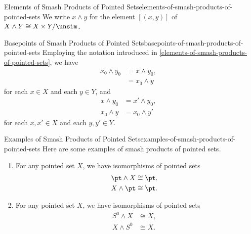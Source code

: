\begin{notation}{Elements of Smash Products of Pointed Sets}{elements-of-smash-products-of-pointed-sets}%
    We write $x\wedge y$ for the element $[(x,y)]$ of $X\wedge Y\cong X\times Y/\unsim$.%
\end{notation}
\begin{remark}{Basepoints of Smash Products of Pointed Sets}{basepoints-of-smash-products-of-pointed-sets}%
    Employing the notation introduced in \cref{elements-of-smash-products-of-pointed-sets}, we have
    \begin{align*}
        x_{0}\wedge y_{0} &= x\wedge y_{0},\\%
                          &= x_{0}\wedge y%
    \end{align*}
    for each $x\in X$ and each $y\in Y$, and
    \begin{align*}
        x\wedge y_{0} &= x'\wedge y_{0},\\%
        x_{0}\wedge y &= x_{0}\wedge y'%
    \end{align*}
    for each $x,x'\in X$ and each $y,y'\in Y$.
\end{remark}
\begin{example}{Examples of Smash Products of Pointed Sets}{examples-of-smash-products-of-pointed-sets}%
    Here are some examples of smash products of pointed sets.
    \begin{enumerate}
        \item\label{examples-of-smash-products-of-pointed-sets-smashing-with-pt}For any pointed set $X$, we have isomorphisms of pointed sets
            \begin{align*}
                \pt\wedge X &\cong \pt,\\
                X\wedge\pt  &\cong \pt.
            \end{align*}
        \item\label{examples-of-smash-products-of-pointed-sets-smashing-with-s-zero}For any pointed set $X$, we have isomorphisms of pointed sets
            \begin{align*}
                S^{0}\wedge X &\cong X,\\
                X\wedge S^{0} &\cong X.
            \end{align*}
    \end{enumerate}
\end{example}
